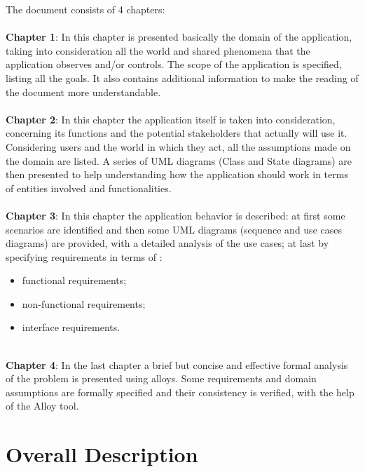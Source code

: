 \documentclass[a4paper]{report}
\begin{document}
The document consists of 4 chapters:
\\ 
\\
\textbf{Chapter 1}: In this chapter is presented basically the domain of the application, taking into consideration all the world and shared phenomena that the application observes and/or controls. The scope of the application is specified, listing all the goals.
It also contains additional information to make the reading of the document more understandable.\\ \\
\textbf{Chapter 2}: In this chapter the application itself is taken into consideration, concerning its functions and the potential stakeholders that actually will use it. Considering users and the world in which they act, all the assumptions made on the domain are listed. A series of UML diagrams (Class and State diagrams) are then presented to help understanding how the application should work in terms of entities involved and functionalities.\\ \\
\textbf{Chapter 3}: 
In this chapter the application behavior is described: at first some scenarios are identified and then some UML diagrams (sequence and use cases diagrams) are provided, with a detailed analysis of the use cases; at last by specifying requirements in terms of :
\begin{itemize}
\item functional requirements;
\item non-functional requirements;
\item interface requirements.\\ \\
\end{itemize}
\textbf{Chapter 4}: In the last chapter a brief but concise and effective formal analysis of the problem is presented using alloys. Some requirements and domain assumptions are formally specified and their consistency is verified, with the help of the Alloy tool.
\\

\chapter{Overall Description}
\end{document}
